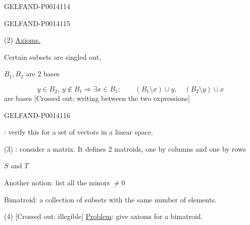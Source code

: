 \begin{GelfandAdjacentEvidence}{GELFAND-P001411}{4}

\end{GelfandAdjacentEvidence}
\begin{GelfandAdjacentEvidence}{GELFAND-P001411}{5}


(2) \uline{Axioms.}

Certain subsets are singled out, 

\(B_1,B_2\) are 2 bases

\[
y\in B_2,\ y\notin B_1\Rightarrow\exists x\in B_1;\qquad
(B_1\setminus x)\cup y,\quad (B_2\setminus y)\cup x
\]
are bases [Crossed out: writing between the two expressions]
\end{GelfandAdjacentEvidence}
\begin{GelfandAdjacentEvidence}{GELFAND-P001411}{6}


: verify this for a set of vectors in a linear space.

(3) : consider a matrix. It defines 2 matroids, one by columns and one by rows

\(S\) and \(T\)

Another notion: list all the minors \(\ne0\)

Bimatroid: a collection of subsets with the same number of elements.

(4) [Crossed out: illegible] \uline{Problem}: give axioms for a bimatroid.
\end{GelfandAdjacentEvidence}



